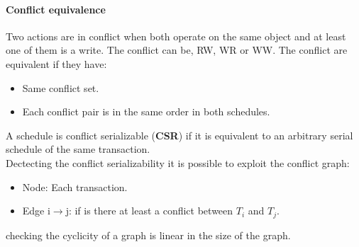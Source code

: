 \documentclass[12pt]{article}
\begin{document}
\paragraph{Conflict equivalence}
Two actions are in conflict when both operate on the same object and at least one of them is a write. The conflict can be, RW, WR or WW. The conflict are equivalent if they have:
\begin{itemize}
  \item Same conflict set.
  \item Each conflict pair is in the same order in both schedules.
\end{itemize}
A schedule is conflict serializable (\textbf{CSR}) if it is equivalent to an arbitrary serial schedule of the same transaction.\\
Dectecting the conflict serializability it is possible to exploit the conflict graph:
\begin{itemize}
  \item Node: Each transaction.
  \item Edge i$\rightarrow$j: if is there at least a conflict between $T_{i}$ and $T_{j}$.
\end{itemize}
checking the cyclicity of a graph is linear in the size of the graph.
\end{document}
